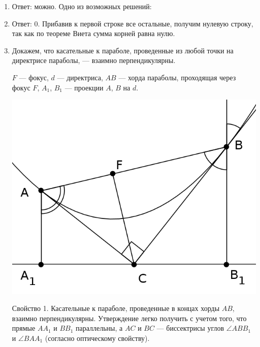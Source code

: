 \begin{enumerate}
\item Ответ: можно. Одно из возможных решений:

\begin{center}
\end{center}

\item Ответ: 0. Прибавив к первой строке все остальные, получим нулевую строку, так как по теореме Виета сумма корней равна нулю.

\item Докажем, что касательные к параболе, проведенные из любой точки на директрисе параболы, --- взаимно перпендикулярны.

$F$ --- фокус, $d$ --- директриса, $AB$ --- хорда параболы, проходящая через фокус $F$, $A_1$, $B_1$ --- проекции $A$, $B$ на $d$. 

\begin{center}
%
\includegraphics{solution/pictures/2013-2014-3}
\end{center}

Свойство 1. Касательные к параболе, проведенные в концах хорды $AB$, взаимно перпендикулярны. Утверждение легко получить с учетом того, что прямые $AA_1$ и $BB_1$ параллельны, а $AC$ и $BC$ --- биссектрисы углов $\angle ABB_1$ и $\angle BAA_1$ (согласно оптическому свойству).


\end{enumerate}
